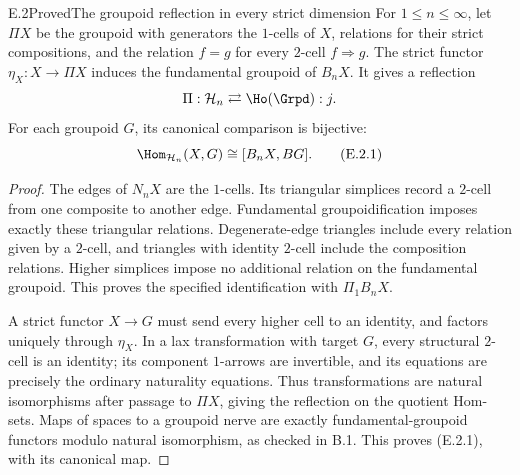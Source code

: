 \begin{claim}{E.2}{Proved}{The groupoid reflection in every strict dimension}
For $1\leq n\leq\infty$, let $\Pi X$ be the groupoid with generators the $1$-cells of $X$, relations for their strict compositions, and the relation $f=g$ for every $2$-cell $f\Rightarrow g$. The strict functor $\eta_X:X\to\Pi X$ induces the fundamental groupoid of $B_nX$. It gives a reflection
\[
 \Pi:\mathcal H_n\rightleftarrows\Ho(\Grpd):j.
\]
For each groupoid $G$, its canonical comparison is bijective:
\[
 \Hom_{\mathcal H_n}(X,G)\cong[B_nX,BG]. \tag{E.2.1}
\]
\end{claim}
\begin{proof}
The edges of $N_nX$ are the $1$-cells. Its triangular simplices record a $2$-cell from one composite to another edge. Fundamental groupoidification imposes exactly these triangular relations. Degenerate-edge triangles include every relation given by a $2$-cell, and triangles with identity $2$-cell include the composition relations. Higher simplices impose no additional relation on the fundamental groupoid. This proves the specified identification with $\Pi_1B_nX$.

A strict functor $X\to G$ must send every higher cell to an identity, and factors uniquely through $\eta_X$. In a lax transformation with target $G$, every structural $2$-cell is an identity; its component $1$-arrows are invertible, and its equations are precisely the ordinary naturality equations. Thus transformations are natural isomorphisms after passage to $\Pi X$, giving the reflection on the quotient Hom-sets. Maps of spaces to a groupoid nerve are exactly fundamental-groupoid functors modulo natural isomorphism, as checked in B.1. This proves (E.2.1), with its canonical map.
\end{proof}

